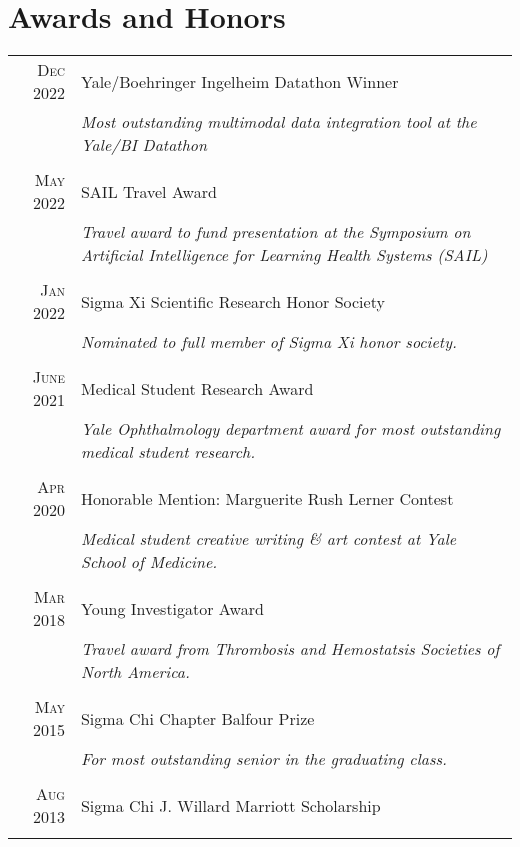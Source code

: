 \documentclass[a4paper,10pt]{article}
\begin{document}
\section{Awards and Honors}
\begin{tabular}{rp{11cm}}
\textsc{Dec} 2022 & Yale/Boehringer Ingelheim Datathon Winner \\
 							    & \small\emph{Most outstanding multimodal data integration tool at the Yale/BI Datathon} \\
 \multicolumn{2}{c}{} \\
 \textsc{May} 2022 & SAIL Travel Award \\
 							    & \small\emph{Travel award to fund presentation at the Symposium on Artificial Intelligence for Learning Health Systems (SAIL)} \\
 \multicolumn{2}{c}{} \\
 \textsc{Jan} 2022 & Sigma Xi Scientific Research Honor Society \\
 							    & \small\emph{Nominated to full member of Sigma Xi honor society.} \\
 \multicolumn{2}{c}{} \\
 \textsc{June} 2021 & Medical Student Research Award \\
 							    & \small\emph{Yale Ophthalmology department  award for most outstanding medical student research.} \\
 \multicolumn{2}{c}{} \\
 \textsc{Apr} 2020 & Honorable Mention: Marguerite Rush Lerner Contest \\
 							    & \small\emph{Medical student creative writing \& art contest at Yale School of Medicine.} \\
 \multicolumn{2}{c}{} \\
 \textsc{Mar} 2018 & Young Investigator Award \\
 							    & \small\emph{Travel award from Thrombosis and Hemostatsis Societies of North America.} \\
 \multicolumn{2}{c}{} \\
 \textsc{May} 2015 & Sigma Chi Chapter Balfour Prize \\
 							    & \small\emph{For most outstanding senior in the graduating class.} \\
 \multicolumn{2}{c}{} \\
 \textsc{Aug} 2013 & Sigma Chi J. Willard Marriott Scholarship \\
 \multicolumn{2}{c}{} \\

\end{tabular}
\end{document}
